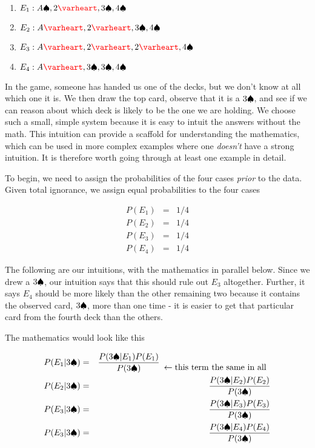 \documentclass{tufte-book}
\begin{document}
\begin{enumerate}
\def\labelenumi{\arabic{enumi}.}
\itemsep1pt\parskip0pt
\item
  \(E_1: A\spades, 2\hearts, 3\spades,4\spades\)
\item
  \(E_2: A\hearts, 2\hearts, 3\spades, 4\spades\)
\item
  \(E_3: A\hearts,2\hearts, 2\hearts,4\spades\)
\item
  \(E_4: A\hearts,3\spades, 3\spades, 4\spades\)
\end{enumerate}

In the game, someone has handed us one of the decks, but we don't know
at all which one it is. We then draw the top card, observe that it is a
\(3\spadesuit\), and see if we can reason about which deck is likely to be
the one we are holding. We choose such a small, simple system because it
is easy to intuit the answers without the math. This intuition can
provide a scaffold for understanding the mathematics, which can be used
in more complex examples where one \emph{doesn't} have a strong
intuition. It is therefore worth going through at least one example in
detail.

To begin, we need to assign the probabilities of the four cases
\emph{prior} to the data. Given total ignorance, we assign equal
probabilities to the four cases

\begin{eqnarray*}
P(E_1)&=&1/4 \\
P(E_2)&=&1/4 \\
P(E_3)&=&1/4 \\
P(E_4)&=&1/4
\end{eqnarray*}

The following are our intuitions, with the mathematics in parallel
below. Since we drew a \(3\spadesuit\), our intuition says that this should
rule out \(E_3\) altogether. Further, it says \(E_4\) should be more
likely than the other remaining two because it contains the observed
card, \(3\spadesuit\), more than one time - it is easier to get that
particular card from the fourth deck than the others.

The mathematics would look like this

\begin{eqnarray*}
P(E_1|3\spades)&=&\frac{P(3\spades|E_1)P(E_1)}{P(3\spades)}\begin{array}{c}\ \\\leftarrow\mbox{this term the same in all}\end{array}\\
P(E_2|3\spades)&=&\frac{P(3\spades|E_2)P(E_2)}{P(3\spades)}\\
P(E_3|3\spades)&=&\frac{P(3\spades|E_3)P(E_3)}{P(3\spades)}\\
P(E_3|3\spades)&=&\frac{P(3\spades|E_4)P(E_4)}{P(3\spades)}
\end{eqnarray*}
\end{document}

